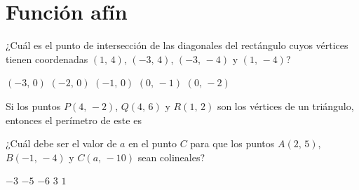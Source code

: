 \documentclass[sin nombre]{srs}
\begin{document}
\section{Función afín}
\begin{preguntas}[after-item-skip=2cm]
\pregunta ¿Cuál es el punto de intersección de las diagonales del rectángulo cuyos vértices tienen coordenadas $\left(1,\,4\right)$, $\left(-3,\,4\right)$, $\left(-3,\,-4\right)$ y $\left(1,\,-4\right)$?
\begin{vertical}
\alternativa $\left(-3,\,0\right)$
\alternativa $\left(-2,\,0\right)$
\alternativa $\left(-1,\,0\right)$
\alternativa $\left(0,\,-1\right)$
\alternativa $\left(0,\,-2\right)$
\end{vertical}

\pregunta Si los puntos $P\left(4,\,-2\right)$, $Q\left(4,\,6\right)$ y $R\left(1,\,2\right)$ son los vértices de un triángulo, entonces el perímetro de este es
\begin{vertical}
\end{vertical}

\pregunta ¿Cuál debe ser el valor de $a$ en el punto $C$ para que los puntos $A\left(2,\,5\right)$, $B\left(-1,\,-4\right)$ y $C\left(a,\,-10\right)$ sean colineales?
\begin{vertical}
\alternativa $-3$
\alternativa $-5$
\alternativa $-6$
\alternativa $3$
\alternativa $1$
\end{vertical}


\end{preguntas}
\end{document}
